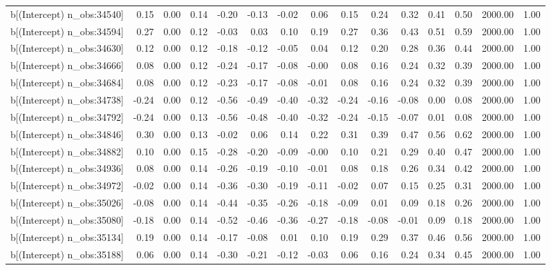 \begin{table}[ht]
\begin{tabular}{rrrrrrrrrrrrrrr}
  b[(Intercept) n\_obs:34540] & 0.15 & 0.00 & 0.14 & -0.20 & -0.13 & -0.02 & 0.06 & 0.15 & 0.24 & 0.32 & 0.41 & 0.50 & 2000.00 & 1.00 \\ 
  b[(Intercept) n\_obs:34594] & 0.27 & 0.00 & 0.12 & -0.03 & 0.03 & 0.10 & 0.19 & 0.27 & 0.36 & 0.43 & 0.51 & 0.59 & 2000.00 & 1.00 \\ 
  b[(Intercept) n\_obs:34630] & 0.12 & 0.00 & 0.12 & -0.18 & -0.12 & -0.05 & 0.04 & 0.12 & 0.20 & 0.28 & 0.36 & 0.44 & 2000.00 & 1.00 \\ 
  b[(Intercept) n\_obs:34666] & 0.08 & 0.00 & 0.12 & -0.24 & -0.17 & -0.08 & -0.00 & 0.08 & 0.16 & 0.24 & 0.32 & 0.39 & 2000.00 & 1.00 \\ 
  b[(Intercept) n\_obs:34684] & 0.08 & 0.00 & 0.12 & -0.23 & -0.17 & -0.08 & -0.01 & 0.08 & 0.16 & 0.24 & 0.32 & 0.39 & 2000.00 & 1.00 \\ 
  b[(Intercept) n\_obs:34738] & -0.24 & 0.00 & 0.12 & -0.56 & -0.49 & -0.40 & -0.32 & -0.24 & -0.16 & -0.08 & 0.00 & 0.08 & 2000.00 & 1.00 \\ 
  b[(Intercept) n\_obs:34792] & -0.24 & 0.00 & 0.13 & -0.56 & -0.48 & -0.40 & -0.32 & -0.24 & -0.15 & -0.07 & 0.01 & 0.08 & 2000.00 & 1.00 \\ 
  b[(Intercept) n\_obs:34846] & 0.30 & 0.00 & 0.13 & -0.02 & 0.06 & 0.14 & 0.22 & 0.31 & 0.39 & 0.47 & 0.56 & 0.62 & 2000.00 & 1.00 \\ 
  b[(Intercept) n\_obs:34882] & 0.10 & 0.00 & 0.15 & -0.28 & -0.20 & -0.09 & -0.00 & 0.10 & 0.21 & 0.29 & 0.40 & 0.47 & 2000.00 & 1.00 \\ 
  b[(Intercept) n\_obs:34936] & 0.08 & 0.00 & 0.14 & -0.26 & -0.19 & -0.10 & -0.01 & 0.08 & 0.18 & 0.26 & 0.34 & 0.42 & 2000.00 & 1.00 \\ 
  b[(Intercept) n\_obs:34972] & -0.02 & 0.00 & 0.14 & -0.36 & -0.30 & -0.19 & -0.11 & -0.02 & 0.07 & 0.15 & 0.25 & 0.31 & 2000.00 & 1.00 \\ 
  b[(Intercept) n\_obs:35026] & -0.08 & 0.00 & 0.14 & -0.44 & -0.35 & -0.26 & -0.18 & -0.09 & 0.01 & 0.09 & 0.18 & 0.26 & 2000.00 & 1.00 \\ 
  b[(Intercept) n\_obs:35080] & -0.18 & 0.00 & 0.14 & -0.52 & -0.46 & -0.36 & -0.27 & -0.18 & -0.08 & -0.01 & 0.09 & 0.18 & 2000.00 & 1.00 \\ 
  b[(Intercept) n\_obs:35134] & 0.19 & 0.00 & 0.14 & -0.17 & -0.08 & 0.01 & 0.10 & 0.19 & 0.29 & 0.37 & 0.46 & 0.56 & 2000.00 & 1.00 \\ 
  b[(Intercept) n\_obs:35188] & 0.06 & 0.00 & 0.14 & -0.30 & -0.21 & -0.12 & -0.03 & 0.06 & 0.16 & 0.24 & 0.34 & 0.45 & 2000.00 & 1.00 \\ 

\end{tabular}
\end{table}
